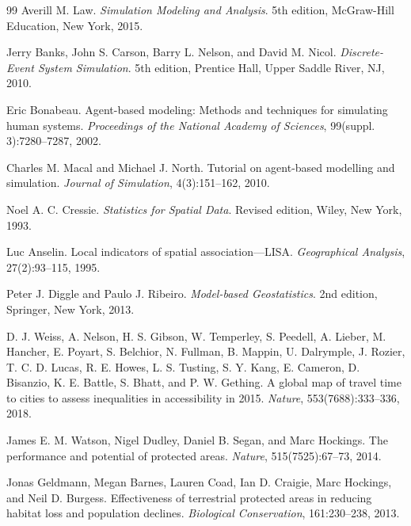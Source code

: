 \begin{thebibliography}{99}
Averill M. Law.
\newblock \emph{Simulation Modeling and Analysis}.
\newblock 5th edition, McGraw-Hill Education, New York, 2015.

Jerry Banks, John S. Carson, Barry L. Nelson, and David M. Nicol.
\newblock \emph{Discrete-Event System Simulation}.
\newblock 5th edition, Prentice Hall, Upper Saddle River, NJ, 2010.

Eric Bonabeau.
\newblock Agent-based modeling: Methods and techniques for simulating human systems.
\newblock \emph{Proceedings of the National Academy of Sciences}, 99(suppl. 3):7280--7287, 2002.

Charles M. Macal and Michael J. North.
\newblock Tutorial on agent-based modelling and simulation.
\newblock \emph{Journal of Simulation}, 4(3):151--162, 2010.

Noel A. C. Cressie.
\newblock \emph{Statistics for Spatial Data}.
\newblock Revised edition, Wiley, New York, 1993.

Luc Anselin.
\newblock Local indicators of spatial association---LISA.
\newblock \emph{Geographical Analysis}, 27(2):93--115, 1995.

Peter J. Diggle and Paulo J. Ribeiro.
\newblock \emph{Model-based Geostatistics}.
\newblock 2nd edition, Springer, New York, 2013.

D. J. Weiss, A. Nelson, H. S. Gibson, W. Temperley, S. Peedell, A. Lieber, M. Hancher, E. Poyart, S. Belchior, N. Fullman, B. Mappin, U. Dalrymple, J. Rozier, T. C. D. Lucas, R. E. Howes, L. S. Tusting, S. Y. Kang, E. Cameron, D. Bisanzio, K. E. Battle, S. Bhatt, and P. W. Gething.
\newblock A global map of travel time to cities to assess inequalities in accessibility in 2015.
\newblock \emph{Nature}, 553(7688):333--336, 2018.

James E. M. Watson, Nigel Dudley, Daniel B. Segan, and Marc Hockings.
\newblock The performance and potential of protected areas.
\newblock \emph{Nature}, 515(7525):67--73, 2014.

Jonas Geldmann, Megan Barnes, Lauren Coad, Ian D. Craigie, Marc Hockings, and Neil D. Burgess.
\newblock Effectiveness of terrestrial protected areas in reducing habitat loss and population declines.
\newblock \emph{Biological Conservation}, 161:230--238, 2013.


\end{thebibliography}

